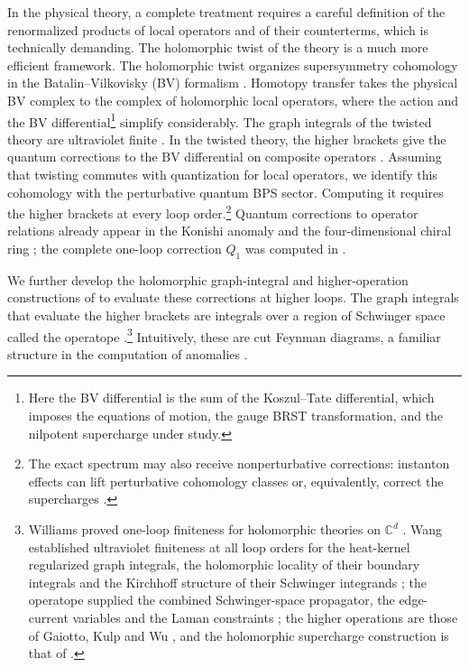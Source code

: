 \documentclass[11pt]{article}
\numberwithin{equation}{section}
\numberwithin{figure}{section}
\numberwithin{table}{section}
\begin{document}
In the physical theory, a complete treatment requires a careful definition of the renormalized products of local operators and of their counterterms, which is technically demanding. The holomorphic twist of the theory is a much more efficient framework. The holomorphic twist organizes supersymmetry cohomology in the Batalin--Vilkovisky (BV) formalism \cite{semichiral,BK}. Homotopy transfer takes the physical BV complex to the complex of holomorphic local operators, where the action and the BV differential\footnote{Here the BV differential is the sum of the Koszul--Tate differential, which imposes the equations of motion, the gauge BRST transformation, and the nilpotent supercharge under study.} simplify considerably. The graph integrals of the twisted theory are ultraviolet finite \cite[Theorem 5 and Corollary 4]{Wang}. In the twisted theory, the higher brackets give the quantum corrections to the BV differential on composite operators \cite{higher,BK}. Assuming that twisting commutes with quantization for local operators, we identify this cohomology with the perturbative quantum BPS sector. Computing it requires the higher brackets at every loop order.\footnote{The exact spectrum may also receive nonperturbative corrections: instanton effects can lift perturbative cohomology classes \cite[Section 1]{semichiral} or, equivalently, correct the supercharges \cite[Section 2.2.1]{BK}.} Quantum corrections to operator relations already appear in the Konishi anomaly and the four-dimensional chiral ring \cite{Konishi,CDSW}; the complete one-loop correction $Q_1$ was computed in \cite{BK}.

We further develop the holomorphic graph-integral and higher-operation constructions of \cite{Wang,operatope,higher,BK} to evaluate these corrections at higher loops. The graph integrals that evaluate the higher brackets are integrals over a region of Schwinger space called the operatope \cite{operatope}.\footnote{Williams proved one-loop finiteness for holomorphic theories on $\mathbb C^d$ \cite[Theorem 3.4]{Williams}. Wang established ultraviolet finiteness at all loop orders for the heat-kernel regularized graph integrals, the holomorphic locality of their boundary integrals and the Kirchhoff structure of their Schwinger integrands \cite[Sections 2--4]{Wang}; the operatope supplied the combined Schwinger-space propagator, the edge-current variables and the Laman constraints \cite[Section 2]{operatope}; the higher operations are those of Gaiotto, Kulp and Wu \cite{higher}, and the holomorphic supercharge construction is that of \cite{semichiral,BK}.} Intuitively, these are cut Feynman diagrams, a familiar structure in the computation of anomalies \cite{Wang,BK}.
\end{document}
